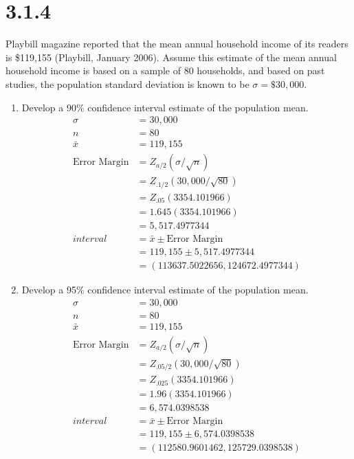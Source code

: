 \documentclass{article}
\begin{document}
\section*{3.1.4}
Playbill magazine reported that the mean annual household income of its readers is \$119,155 (Playbill, January 2006). Assume this estimate of the mean annual household income is based on a sample of 80 households, and based on past studies, the population standard deviation is known to be $\sigma = \$30,000$.
\begin{enumerate}
  \item Develop a 90\% confidence interval estimate of the population mean.
  \begin{align*}
    \sigma &= 30,000\\
    n &= 80\\
    \bar{x} &= 119,155\\
    \text{Error Margin} &= Z_{a/2}(\sigma / \sqrt{n})\\
    &=Z_{.1/2}(30,000/ \sqrt{80})\\
    &=Z_{.05}(3354.101966)\\
    &=1.645(3354.101966)\\
    &=5,517.4977344\\
    interval &= \bar{x} \pm \text{Error Margin}\\
    &= 119,155 \pm 5,517.4977344\\
    &= (113637.5022656, 124672.4977344)
  \end{align*}

  \item Develop a 95\% confidence interval estimate of the population mean.
  \begin{align*}
    \sigma &= 30,000\\
    n &= 80\\
    \bar{x} &= 119,155\\
    \text{Error Margin} &= Z_{a/2}(\sigma / \sqrt{n})\\
    &=Z_{.05/2}(30,000/ \sqrt{80})\\
    &=Z_{.025}(3354.101966)\\
    &=1.96(3354.101966)\\
    &=6,574.0398538\\
    interval &= \bar{x} \pm \text{Error Margin}\\
    &= 119,155 \pm 6,574.0398538\\
    &= (112580.9601462, 125729.0398538)
  \end{align*}


\end{enumerate}
\end{document}
